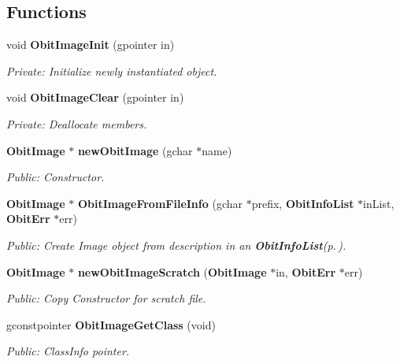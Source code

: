 \subsection*{Functions}
\begin{CompactItemize}
\item 
void {\bf Obit\-Image\-Init} (gpointer in)
\begin{CompactList}\small\item\em Private: Initialize newly instantiated object. \item\end{CompactList}\item 
void {\bf Obit\-Image\-Clear} (gpointer in)
\begin{CompactList}\small\item\em Private: Deallocate members. \item\end{CompactList}\item 
{\bf Obit\-Image} $\ast$ {\bf new\-Obit\-Image} (gchar $\ast$name)
\begin{CompactList}\small\item\em Public: Constructor. \item\end{CompactList}\item 
{\bf Obit\-Image} $\ast$ {\bf Obit\-Image\-From\-File\-Info} (gchar $\ast$prefix, {\bf Obit\-Info\-List} $\ast$in\-List, {\bf Obit\-Err} $\ast$err)
\begin{CompactList}\small\item\em Public: Create Image object from description in an {\bf Obit\-Info\-List}{\rm (p.\,\pageref{structObitInfoList})}. \item\end{CompactList}\item 
{\bf Obit\-Image} $\ast$ {\bf new\-Obit\-Image\-Scratch} ({\bf Obit\-Image} $\ast$in, {\bf Obit\-Err} $\ast$err)
\begin{CompactList}\small\item\em Public: Copy Constructor for scratch file. \item\end{CompactList}\item 
gconstpointer {\bf Obit\-Image\-Get\-Class} (void)
\begin{CompactList}\small\item\em Public: Class\-Info pointer. \item\end{CompactList}\item 

\end{CompactItemize}
